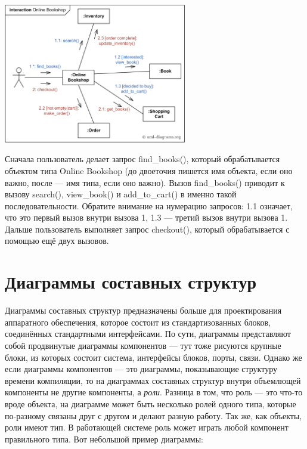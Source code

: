 \documentclass{../mcstext}
\begin{document}
\begin{center}
    \includegraphics[width=0.6\textwidth]{communicationDiagramExample.png}
\end{center}

Сначала пользователь делает запрос find\_books(), который обрабатывается объектом типа Online Bookshop (до двоеточия пишется имя объекта, если оно важно, после --- имя типа, если оно важно). Вызов find\_books() приводит к вызову search(), view\_book() и add\_to\_cart() в именно такой последовательности. Обратите внимание на нумерацию запросов: 1.1 означает, что это первый вызов внутри вызова 1, 1.3 --- третий вызов внутри вызова 1. Дальше пользователь выполняет запрос checkout(), который обрабатывается с помощью ещё двух вызовов.

\section{Диаграммы составных структур}

Диаграммы составных структур предназначены больше для проектирования аппаратного обеспечения, которое состоит из стандартизованных блоков, соединённых стандартными интерфейсами. По сути, диаграммы представляют собой продвинутые диаграммы компонентов --- тут тоже рисуются крупные блоки, из которых состоит система, интерфейсы блоков, порты, связи. Однако же если диаграммы компонентов --- это диаграммы, показывающие структуру времени компиляции, то на диаграммах составных структур внутри объемлющей компоненты не другие компоненты, а \textit{роли}. Разница в том, что роль --- это что-то вроде объекта, на диаграмме может быть несколько ролей одного типа, которые по-разному связаны друг с другом и делают разную работу. Так же, как объекты, роли имеют тип. В работающей системе роль может играть любой компонент правильного типа. Вот небольшой пример диаграммы:
\end{document}
